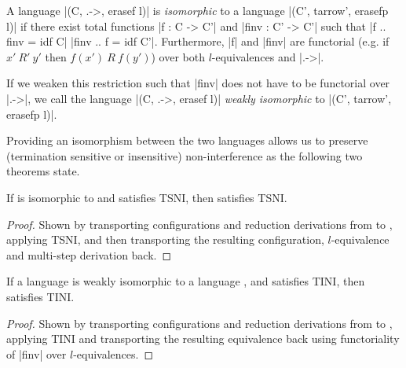 \begin{definition}
  A language |(C, .->, erasef l)| is \textit{isomorphic} to a
  language |(C', tarrow', erasefp l)| if there exist total functions |f
  : C -> C'| and |finv : C' -> C'| such that |f .. finv = idf C| |finv
  .. f = idf C'|.  Furthermore, |f| and |finv| are functorial (e.g. if
  $x'\ R'\ y'$ then $f(x')\ R\ f(y')$) over both
  $l$-equivalences and |.->|.
  
  If we weaken this restriction such that |finv| does
  not have to be functorial over |.->|, we call the
  language |(C, .->, erasef l)| \textit{weakly isomorphic} to
  |(C', tarrow', erasefp l)|.
\end{definition}

Providing an isomorphism between the two languages allows us to
preserve (termination sensitive or insensitive) non-interference
as the following two theorems state.

\begin{theorem}
  \label{thm:iso-tsni}
  If  is isomorphic to  and  satisfies TSNI, then
   satisfies TSNI.
\end{theorem}

\begin{proof}
  Shown by transporting configurations and reduction derivations from
   to , applying TSNI, and then transporting the
  resulting configuration, $l$-equivalence and multi-step derivation back.
\end{proof}

\begin{theorem}
  \label{thm:iso-tini}
  If a language  is weakly isomorphic to a language , and 
  satisfies TINI, then  satisfies TINI.
\end{theorem}

\begin{proof}
  Shown by transporting configurations and reduction derivations
  from  to , applying TINI and transporting the resulting
  equivalence back using functoriality of |finv| over $l$-equivalences.
\end{proof}

